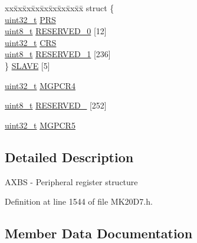 \begin{DoxyCompactItemize}
\begin{tabbing}
\end{tabbing}\item 
\begin{tabbing}
xx\=xx\=xx\=xx\=xx\=xx\=xx\=xx\=xx\=\kill
struct \{\\
\>\hyperlink{_p_e___types_8h_a33594304e786b158f3fb30289278f5af}{uint32\_t} \hyperlink{struct_a_x_b_s___mem_map_a840c4c5791c39bad3cfa7140aaab0a1f}{PRS}\\
\>\hyperlink{_p_e___types_8h_aba7bc1797add20fe3efdf37ced1182c5}{uint8\_t} \hyperlink{struct_a_x_b_s___mem_map_abd29af23a1cdc627c9e3d58d5f0a572f}{RESERVED\_0} \mbox{[}12\mbox{]}\\
\>\hyperlink{_p_e___types_8h_a33594304e786b158f3fb30289278f5af}{uint32\_t} \hyperlink{struct_a_x_b_s___mem_map_af4605bf03bb478b8076fffe21d52671f}{CRS}\\
\>\hyperlink{_p_e___types_8h_aba7bc1797add20fe3efdf37ced1182c5}{uint8\_t} \hyperlink{struct_a_x_b_s___mem_map_afde851f375ecbf7be79930c0127ddcb1}{RESERVED\_1} \mbox{[}236\mbox{]}\\
\} \hyperlink{struct_a_x_b_s___mem_map_ab7a97c697372d87a7a5299a2f3084425}{SLAVE} \mbox{[}5\mbox{]}\\

\end{tabbing}\item 
\hyperlink{_p_e___types_8h_a33594304e786b158f3fb30289278f5af}{uint32\+\_\+t} \hyperlink{struct_a_x_b_s___mem_map_aa612f4c47ff1bbd854bacda326b25aea}{M\+G\+P\+C\+R4}
\item 
\hyperlink{_p_e___types_8h_aba7bc1797add20fe3efdf37ced1182c5}{uint8\+\_\+t} \hyperlink{struct_a_x_b_s___mem_map_aa163ab2918180ca89176ceb13b329716}{R\+E\+S\+E\+R\+V\+E\+D\+\_} \mbox{[}252\mbox{]}
\item 
\hyperlink{_p_e___types_8h_a33594304e786b158f3fb30289278f5af}{uint32\+\_\+t} \hyperlink{struct_a_x_b_s___mem_map_acb7e6f493df6513d2eca0df6a7f8f3ed}{M\+G\+P\+C\+R5}
\end{DoxyCompactItemize}


\subsection{Detailed Description}
A\+X\+BS -\/ Peripheral register structure 

Definition at line 1544 of file M\+K20\+D7.\+h.



\subsection{Member Data Documentation}
